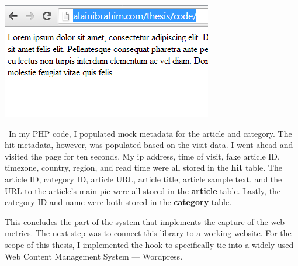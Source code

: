 \documentclass[12pt]{article}
\begin{document}
{\noindent\includegraphics[scale=1]{img/visit1}

\noindent\ In my PHP code, I populated mock metadata for the article and category. The hit metadata, however, was populated based on the visit data. I went ahead and visited the page for ten seconds. My ip address, time of visit, fake article ID, timezone, country, region, and read time were all stored in the \textbf{hit} table. The article ID, category ID, article URL, article title, article sample text, and the URL to the article's main pic were all stored in the \textbf{article} table. Lastly, the category ID and name were both stored in the \textbf{category} table.

This concludes the part of the system that implements the capture of the web metrics. The next step was to connect this library to a working website. For the scope of this thesis, I implemented the hook to specifically tie into a widely used Web Content Management System --- Wordpress. 

\newpage

}
\end{document}

